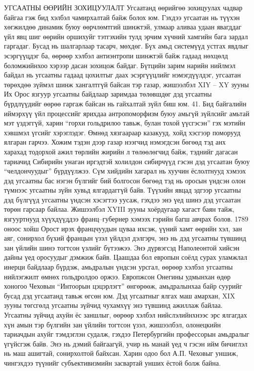 УГСААТНЫ ӨӨРИЙН ЗОХИЦУУЛАЛТ
Угсаатанд өөрийгөө зохицуулах чадвар байгаа гэж бид хэлбэл чамирхалтай байж болох юм. Гэхдээ угсаатан нь түүхэн хөгжилдөө динамик буюу өөрчлөмтгий шинжтэй, улмаар аливаа удаан явагддаг үйл явц шиг өөрийн оршихуйг тэтгэхийн тулд эрчим хүчний хамгийн бага зардал гаргадаг. Бусад нь шалгарлаар тасарч, мөхдөг. Бүх амьд системүүд устгах явдлыг эсэргүүцдэг ба, өөрөөр хэлбэл антиэнтропи шинжтэй байж гадаад нөхцөлд боломжийнхоо хэрээр дасан зохицож байдаг. Бүтцийн зарим нарийн нийлмэл байдал нь угсаатны гадаад цохилтыг даах эсэргүүцлийг нэмэгдүүлдэг, угсаатан төрөхдөө зүймэл шинж хангалтгүй байсан тэр газар, жишээлбэл XIY – XY зууны Их Орос язгуур угсаатны байдлаар заримдаа төлөвшдөг дэд угсаатны бүрдлүүдийг өөрөө гаргаж байсан нь гайхалтай зүйл биш юм.
41. Бид байгалийн иймэрхүү үйл процессийг ярихдаа антропоморфизм буюу амьгүй зүйлсийг амьтай мэт үздэггүй, харин “горхи гольдрилоо тавьж, булан тохой үүсгэсэн” гэх мэтийн хэвшмэл үгсийг хэрэглэдэг.
Өмнөд хязгаараар казакууд, хойд хэсгээр поморууд ялгаран гарчээ. Хожим тэдэн дээр газар нээгчид нэмэгдсэн бөгөөд тэд анх харахад тодорхой ажил төрлийн жирийн л төлөөлөгчид байж, тэднийг дагасан тариачид Сибирийн унаган иргэдтэй холилдон сибирчүүд гэсэн дэд угсаатан буюу “челдончуудыг” бүрдүүлжээ. Сүм хийдийн хагарал нь хуучин ёслолтнууд хэмээх дэд угсаатны бас нэгэн бүлгийг бий болгосон бөгөөд тэд нь оросын үндсэн олон түмнээс угсаатны зүйн хувьд ялгардаггүй байв. Түүхийн явцад эдгээр угсаатны дэд бүлгүүд угсаатны үндсэн хэсэгтээ уусаж, гэхдээ энэ үед шинэ дэд угсаатан төрөн гарсаар байлаа.
Жишээлбэл XYIII зууны хоёрдугаар хагаст баян тайж, язгууртнууд хүүхдүүддээ франц–губернер хэмээх гэрийн багш авчрах болов. 1789 оноос хойш Орост ирэх францчуудын цуваа ихсэж, үүний хамт өөрийн хэл, зан аяг, сонирхол бүхий францын үзэл үйлдэл дэлгэрч, энэ нь дэд угсаатны түвшинд зан үйлийн шинэ тогтсон үзлийг бүтээжээ. Энэ дүрвэгсэд Наполеонтой хийсэн дайны үед оросуудыг дэмжиж байв. Цаашдаа бол европын соёлд сурах уламжлал инерци байдлаар бүрдэж, амьдралын үндсэн урсгал, өөрөөр хэлбэл угсаатны нийлэгжилт өмнөх гольдролдоо оржээ. Европжсон Онегины удмынхан өдөр хоногоо Чеховын “Интоорын цэцэрлэгт” өнгөрөөж, амьдралынхаа байр суурийг бусад дэд угсаатанд тавьж өгсөн юм.
Дэд угсаатныг ялгах маш амархан, XIX зууны төгсгөлд угсаатны зүйчид чухамхүү энэ түвшинд ажиллаж байлаа. Угсаатны зүйчид ахуйн ёс заншлыг, өөрөөр хэлбэл нийслэлийнхнээс эрс ялгагдах хүн амын тэр бүлгийн зан үйлийн тогтсон үзэл, жишээлбэл, олонецкийн тариачдын ахуйг тэмдэглэн судалж, гэхдээ Петербургийн профессорын амьдралыг үгүйсгэж байв. Энэ нь дэмий байгаагүй, учир нь манай үед ч гэсэн ийм бичиглэл нь маш ашигтай, сонирхолтой байхсан. Харин одоо бол А.П. Чеховыг уншиж, чингэхдээ түүнийг субъективизмийн засвартай унших ёстой болж байна.
